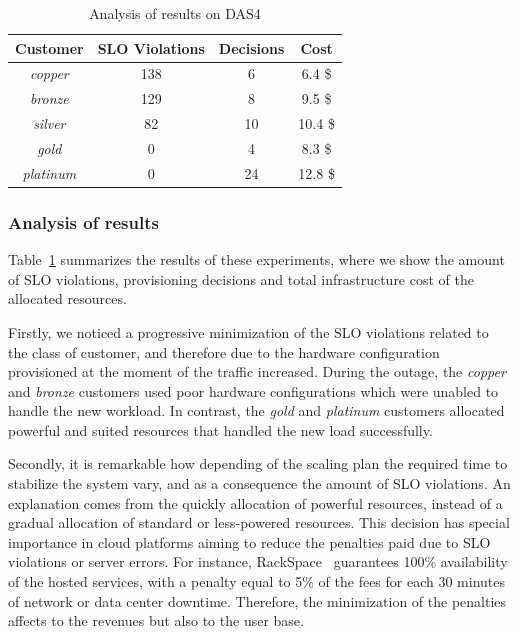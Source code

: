 \begin{table}
  {\scriptsize 
\begin{center}
    \begin{tabular}{  | c | c | c | c  |}
    \hline
         \textbf{Customer}  & \textbf{SLO Violations} & \textbf{Decisions}  & \textbf{Cost}   \\ \hline
   \textit{copper}   & 138  &  6 &  6.4 \$ \\ \hline   
   \textit{bronze}  &  129 &   8&  9.5 \$  \\ \hline   
   \textit{silver}  &  82  & 10  &  10.4 \$  \\ \hline   
   \textit{gold}  & 0  &  4  &   8.3 \$    \\ \hline   
\textit{platinum} &  0 & 24 & 12.8 \$  \\ \hline   

 \end{tabular}
\end{center}
\vspace{-5mm}
\caption{Analysis of results on DAS4}
\label{summaryDAS4}
}
\end{table}

\subsubsection{Analysis of results}

Table~\ref{summaryDAS4} summarizes the results of these experiments, where we show the amount of SLO violations, provisioning decisions and total infrastructure cost of the allocated resources. 

Firstly, we noticed a progressive minimization of the SLO violations related to the class of customer, and therefore due to the hardware configuration provisioned at the moment of the traffic increased. During the outage, the \emph{copper} and \emph{bronze} customers used poor hardware configurations which were unabled to handle the new workload. In contrast, the \emph{gold}  and \emph{platinum} customers allocated powerful and suited resources that handled the new load successfully.

Secondly, it is remarkable how depending of the scaling plan the required time to stabilize the system vary, and as a consequence the amount of SLO violations. An explanation comes from the quickly allocation of powerful resources, instead of a gradual allocation of standard or less-powered resources. This decision has special importance in cloud platforms aiming to reduce the penalties paid due to SLO violations or server errors. For instance, RackSpace~\cite{rackspace} guarantees 100\% availability of the hosted services, with a penalty equal to 5\% of the fees for each 30 minutes of network or data center downtime. Therefore, the minimization of the penalties affects to the revenues but also to the user base.

